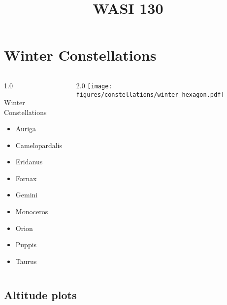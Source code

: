 \documentclass[final]{beamer}
\title{WASI 130}
\newlength{\colwidth}
\begin{document}
\section{Winter Constellations}

\begin{frame}[t]{}
  \begin{columns}[T]
    \begin{column}{1.0\colwidth}
      \Large
      \begin{block}{Winter Constellations}
        \begin{itemize}
          \item{Auriga}
          \item{Camelopardalis}
          \item{Eridanus}
          \item{Fornax}
          \item{Gemini}
          \item{Monoceros}
          \item{Orion}
          \item{Puppis}
          \item{Taurus}
        \end{itemize}
      \end{block}
    \end{column}
    \begin{column}{2.0\colwidth}
      \centering
      \texttt{[image: figures/constellations/winter\_hexagon.pdf]}
    \end{column}
  \end{columns}
\end{frame}

\subsection{Altitude plots}
\end{document}
